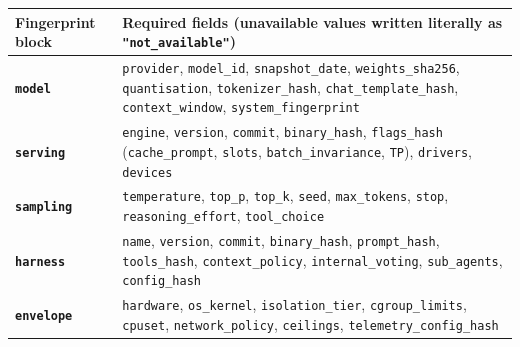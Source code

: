 \documentclass[10pt,letterpaper]{article}
\begin{document}
{\footnotesize\setlength{\tabcolsep}{3.8pt}\renewcommand{\arraystretch}{1.15}
\begin{longtable}[]{@{}
  >{\raggedright\arraybackslash}p{}
  >{\raggedright\arraybackslash}p{}@{}}
\toprule\noalign{}
\begin{minipage}[b]{\linewidth}\raggedright
\textbf{Fingerprint block}
\end{minipage} & \begin{minipage}[b]{\linewidth}\raggedright
\textbf{Required fields (unavailable values written literally as
\texttt{"not\_\allowbreak{}available"})}
\end{minipage} \\
\midrule\noalign{}
\endhead
\bottomrule\noalign{}
\endlastfoot
\textbf{\texttt{model}} & \texttt{provider}, \texttt{model\_id},
\texttt{snapshot\_\allowbreak{}date}, \texttt{weights\_\allowbreak{}sha256},
\texttt{quantisation}, \texttt{tokenizer\_\allowbreak{}hash},
\texttt{chat\_\allowbreak{}template\_\allowbreak{}hash}, \texttt{context\_\allowbreak{}window},
\texttt{system\_\allowbreak{}fingerprint} \\
\textbf{\texttt{serving}} & \texttt{engine}, \texttt{version},
\texttt{commit}, \texttt{binary\_\allowbreak{}hash}, \texttt{flags\_\allowbreak{}hash}
(\texttt{cache\_\allowbreak{}prompt}, \texttt{slots}, \texttt{batch\_\allowbreak{}invariance},
\texttt{TP}), \texttt{drivers}, \texttt{devices} \\
\textbf{\texttt{sampling}} & \texttt{temperature}, \texttt{top\_p},
\texttt{top\_k}, \texttt{seed}, \texttt{max\_\allowbreak{}tokens}, \texttt{stop},
\texttt{reasoning\_\allowbreak{}effort}, \texttt{tool\_\allowbreak{}choice} \\
\textbf{\texttt{harness}} & \texttt{name}, \texttt{version},
\texttt{commit}, \texttt{binary\_\allowbreak{}hash}, \texttt{prompt\_\allowbreak{}hash},
\texttt{tools\_\allowbreak{}hash}, \texttt{context\_\allowbreak{}policy},
\texttt{internal\_\allowbreak{}voting}, \texttt{sub\_\allowbreak{}agents},
\texttt{config\_\allowbreak{}hash} \\
\textbf{\texttt{envelope}} & \texttt{hardware}, \texttt{os\_\allowbreak{}kernel},
\texttt{isolation\_\allowbreak{}tier}, \texttt{cgroup\_\allowbreak{}limits}, \texttt{cpuset},
\texttt{network\_\allowbreak{}policy}, \texttt{ceilings},
\texttt{telemetry\_\allowbreak{}config\_\allowbreak{}hash} \\
\end{longtable}
}
\end{document}
